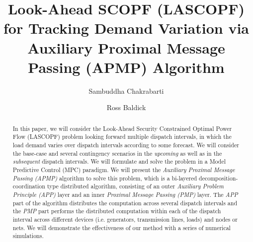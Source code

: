 \documentclass[preprint,12pt,3p]{elsarticle}
\begin{document}
	\begin{frontmatter}
		\title{Look-Ahead SCOPF (LASCOPF) for Tracking Demand Variation via Auxiliary Proximal Message Passing (APMP) Algorithm
			}
		\author[label1]{Sambuddha Chakrabarti}
		\address[label1]{Department of Electrical \& Computer Engineering (ECE), The University of Texas at Austin,
			Austin, TX 78705, USA}
		\author[label1]{Ross Baldick}
		\begin{abstract}
			In this paper, we will consider the Look-Ahead Security Constrained Optimal Power Flow (LASCOPF) problem looking forward multiple dispatch intervals, in which the load demand varies over dispatch intervals according to some forecast. We will consider the base-case and several contingency scenarios in the \emph{upcoming} as well as in the \emph{subsequent} dispatch intervals. We will formulate and solve the problem in a Model Predictive Control (MPC) paradigm. We will present the \emph{Auxiliary Proximal Message Passing (APMP)} algorithm to solve this problem, which is a bi-layered decomposition-coordination type distributed algorithm, consisting of an outer \emph{Auxiliary Problem Principle (APP)} layer and an inner \emph{Proximal Message Passing (PMP)} layer. The \emph{APP} part of the algorithm distributes the computation across several dispatch intervals and the \emph{PMP} part performs the distributed computation within each of the dispatch interval across different devices (i.e. generators, transmission lines, loads) and nodes or nets. We will demonstrate the effectiveness of our method with a series of numerical simulations.\\  
		\end{abstract}
	\end{frontmatter}
\end{document}
